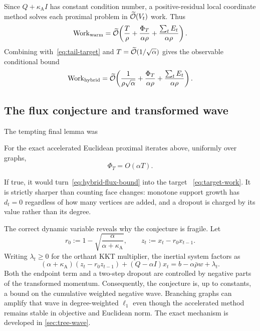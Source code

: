 Since $Q+\kappa_{\mathrm A} I$ has constant condition number, a positive-residual local
coordinate method solves each proximal problem in $\widetilde{\mathcal{O}}(V_t)$ work.  Thus
\begin{equation}
 \operatorname{Work}_{\mathrm{warm}}
 =\widetilde{\mathcal{O}}\!\left(
   \frac{T}{\rho}
   +\frac{\Phi_T}{\alpha\rho}
   +\frac{\sum_tE_t}{\alpha\rho}
 \right).
 \label{eq:warm-work-flux}
\end{equation}
Combining with~\eqref{eq:tail-target} and
$T=\widetilde{\mathcal{O}}(1/\sqrt\alpha)$ gives the observable conditional bound
\begin{equation}
 \operatorname{Work}_{\mathrm{hybrid}}
 =\widetilde{\mathcal{O}}\!\left(
   \frac1{\rho\sqrt\alpha}
   +\frac{\Phi_T}{\alpha\rho}
   +\frac{\sum_tE_t}{\alpha\rho}
 \right).
 \label{eq:hybrid-flux-bound}
\end{equation}

\subsection{The flux conjecture and transformed wave}

The tempting final lemma was
\begin{conjecture}
\label{conj:flux}
For the exact accelerated Euclidean proximal iterates above, uniformly over
graphs,
\begin{equation}
 \Phi_T=O(\alpha T).
 \label{eq:flux-conjecture}
\end{equation}
\end{conjecture}
If true, it would turn~\eqref{eq:hybrid-flux-bound} into the target
~\eqref{eq:target-work}.  It is strictly sharper than counting face changes:
monotone support growth has $d_t=0$ regardless of how many vertices are
added, and a dropout is charged by its value rather than its degree.

The correct dynamic variable reveals why the conjecture is fragile.  Let
\[
 r_0:=1-\sqrt{\frac{\alpha}{\alpha+\kappa_{\mathrm A}}},
 \qquad
 z_t:=x_t-r_0x_{t-1}.
\]
Writing $\lambda_t\ge0$ for the orthant KKT multiplier, the inertial system
factors as
\begin{equation}
 (\alpha+\kappa_{\mathrm A})(z_t-r_0z_{t-1})
 +(Q-\alpha I)x_t
 =b-\alpha\bar\rho w+\lambda_t.
 \label{eq:transformed-wave}
\end{equation}
Both the endpoint term and a two-step dropout are controlled by negative
parts of the transformed momentum.  Consequently, the conjecture is, up to
constants, a bound on the cumulative weighted negative wave.  Branching
graphs can amplify that wave in degree-weighted $\ell_1$ even though the
accelerated method remains stable in objective and Euclidean norm.  The exact
mechanism is developed in \cref{sec:tree-wave}.
